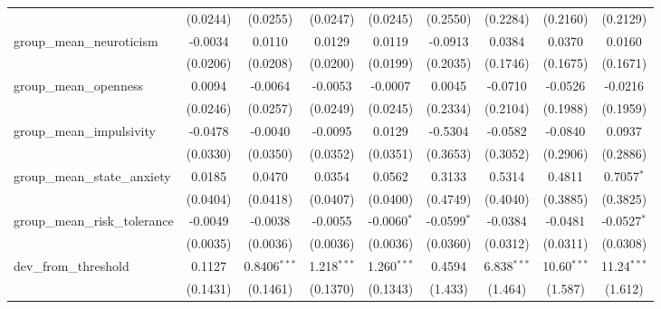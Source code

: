 \begin{tabular}{lcccccccc}
                                    & (0.0244)        & (0.0255)        & (0.0247)        & (0.0245)        & (0.2550)       & (0.2284)       & (0.2160)       & (0.2129)\\   
   group\_mean\_neuroticism         & -0.0034         & 0.0110          & 0.0129          & 0.0119          & -0.0913        & 0.0384         & 0.0370         & 0.0160\\   
                                    & (0.0206)        & (0.0208)        & (0.0200)        & (0.0199)        & (0.2035)       & (0.1746)       & (0.1675)       & (0.1671)\\   
   group\_mean\_openness            & 0.0094          & -0.0064         & -0.0053         & -0.0007         & 0.0045         & -0.0710        & -0.0526        & -0.0216\\   
                                    & (0.0246)        & (0.0257)        & (0.0249)        & (0.0245)        & (0.2334)       & (0.2104)       & (0.1988)       & (0.1959)\\   
   group\_mean\_impulsivity         & -0.0478         & -0.0040         & -0.0095         & 0.0129          & -0.5304        & -0.0582        & -0.0840        & 0.0937\\   
                                    & (0.0330)        & (0.0350)        & (0.0352)        & (0.0351)        & (0.3653)       & (0.3052)       & (0.2906)       & (0.2886)\\   
   group\_mean\_state\_anxiety      & 0.0185          & 0.0470          & 0.0354          & 0.0562          & 0.3133         & 0.5314         & 0.4811         & 0.7057$^{*}$\\   
                                    & (0.0404)        & (0.0418)        & (0.0407)        & (0.0400)        & (0.4749)       & (0.4040)       & (0.3885)       & (0.3825)\\   
   group\_mean\_risk\_tolerance     & -0.0049         & -0.0038         & -0.0055         & -0.0060$^{*}$   & -0.0599$^{*}$  & -0.0384        & -0.0481        & -0.0527$^{*}$\\   
                                    & (0.0035)        & (0.0036)        & (0.0036)        & (0.0036)        & (0.0360)       & (0.0312)       & (0.0311)       & (0.0308)\\   
   dev\_from\_threshold             & 0.1127          & 0.8406$^{***}$  & 1.218$^{***}$   & 1.260$^{***}$   & 0.4594         & 6.838$^{***}$  & 10.60$^{***}$  & 11.24$^{***}$\\   
                                    & (0.1431)        & (0.1461)        & (0.1370)        & (0.1343)        & (1.433)        & (1.464)        & (1.587)        & (1.612)\\   

\end{tabular}
